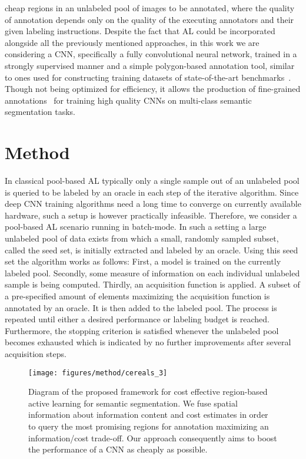 \documentclass{bmvc2k}
\begin{document}
cheap regions in an unlabeled pool of images to be annotated, where the quality of annotation depends only on the quality of the executing annotators and their given labeling instructions. Despite the fact that AL could be incorporated alongside all the previously mentioned approaches, in this work we are considering a CNN, specifically a fully convolutional neural network, trained in a strongly supervised manner and a simple polygon-based annotation tool, similar to ones used for constructing training datasets of state-of-the-art benchmarks~\cite{DBLP:conf/cvpr/CordtsORREBFRS16,DBLP:conf/iccv/NeuholdOBK17,DBLP:conf/cvpr/ZhouZPFB017}. Though not being optimized for efficiency, it allows the production of fine-grained annotations~\cite{DBLP:journals/ijcv/RussellTMF08} for training high quality CNNs on multi-class semantic segmentation tasks.
\label{sec:related}
\section{Method}

In classical pool-based AL typically only a single sample out of an unlabeled pool is queried to be labeled by an oracle in each step of the iterative algorithm. Since deep CNN training algorithms need a long time to converge on currently available hardware, such a setup is however practically infeasible. Therefore, we consider a pool-based AL scenario running in batch-mode. In such a setting a large unlabeled pool of data exists from which a small, randomly sampled subset, called the seed set, is initially extracted and labeled by an oracle. Using this seed set the algorithm works as follows: First, a model is trained on the currently labeled pool. Secondly, some measure of information on each individual unlabeled sample is being computed. Thirdly, an acquisition function is applied. A subset of a pre-specified amount of elements maximizing the acquisition function is annotated by an oracle. It is then added to the labeled pool. The process is repeated until either a desired performance or labeling budget is reached. Furthermore, the stopping criterion is satisfied whenever the unlabeled pool becomes exhausted which is indicated by no further improvements after several acquisition steps.

\begin{figure}[!ht]{\texttt{[image: figures/method/cereals\_3]}}
\centering
\caption{Diagram of the proposed framework for cost effective region-based active learning for semantic segmentation. We fuse spatial information about information content and cost estimates in order to query the most promising regions for annotation maximizing an information/cost trade-off. Our approach consequently aims to boost the performance of a CNN as cheaply as possible.}
\label{fig:method:cereals}
\vspace{-0.25cm}
\end{figure}
\end{document}
